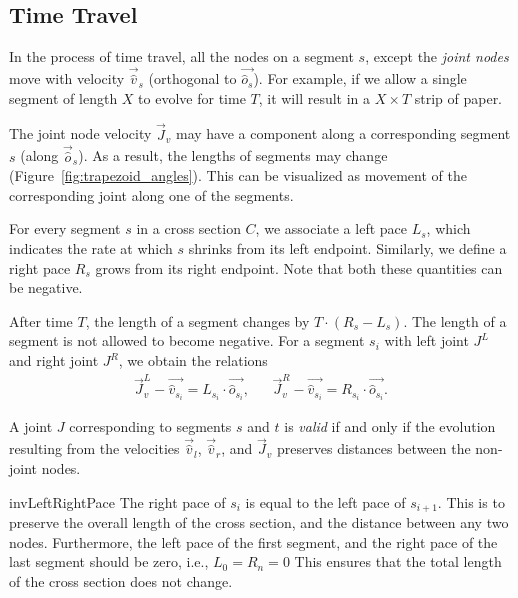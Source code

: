 \subsection{Time Travel}
\label{sec:time_travel}

In the process of time travel, all the nodes on a segment $s$, except the
\emph{joint nodes} move with velocity $\vec{\hat v}_s$ (orthogonal to $\vec{\hat
o_s}$). For example, if we allow a single segment of length $X$ to evolve for
time $T$, it will result in a $X\times T$ strip of paper.

The joint node velocity $\vec J_v$ may have a component along a corresponding
segment $s$ (along $\vec{\hat o}_s$). As a result, the lengths of segments may
change (Figure~\ref{fig:trapezoid_angles}). This can be visualized as movement
of the corresponding joint along one of the segments.

\begin{definition}
\label{def:segment_length}
For every segment $s$ in a cross section $C$, we associate a left pace $L_s$,
which indicates the rate at which $s$ shrinks from its left endpoint.
Similarly, we define a right pace $R_s$ grows from its right endpoint.
Note that both these quantities can be negative.
\end{definition}
After time $T$, the length of a segment changes by $T\cdot(R_s-L_s)$.
The length of a segment is not allowed to become negative.
For a segment $s_i$ with left joint $J^L$ and right joint $J^R$, we obtain the relations
\begin{align*}
\vec J_v^L-\vec{\hat v_{s_i}} = L_{s_i}\cdot \vec{\hat o_{s_i}}, && \vec J_v^R-\vec{\hat v_{s_i}} = R_{s_i}\cdot \vec{\hat o_{s_i}}.
\end{align*}

\begin{definition}
\label{def:valid_joint}
A joint $J$ corresponding to segments $s$ and $t$ is \emph{valid} if and only if the evolution
resulting from the velocities $\vec{\hat v}_l$, $\vec{\hat v}_r$, and $\vec J_v$ preserves distances between the non-joint nodes.
\end{definition}
\vspace{-1pc}
\begin{restatable}{inv}{LeftRightPace}
\label{inv:left_right_pace}
The right pace of $s_{i}$ is equal to the left pace of $s_{i+1}$.
This is to preserve the overall length of the cross section, and the distance between any two nodes.
Furthermore, the left pace of the first segment, and the right pace of the last segment should be zero, i.e., $L_0 = R_n = 0$
This ensures that the total length of the cross section does not change.
\end{restatable}


